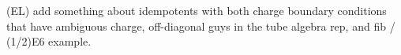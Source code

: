 \documentclass[12pt,a4paper]{article}
\newcommand{\tp}{\otimes}
\newcommand\be            {\begin{equation}}
\newcommand\ee            {\end{equation}}
\newcommand{\fld}{\mathcal{F}} %
\newcommand{\ethan}[1]{{\color{amethyst}\footnotesize{(EL) #1}}}
\begin{document}
\ethan{add something about idempotents with both charge boundary conditions that have ambiguous charge, off-diagonal guys in the tube algebra rep, and fib / (1/2)E6 example.}

\end{document}
